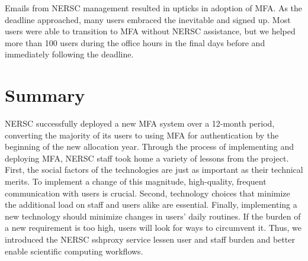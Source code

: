 \documentclass[sigconf,review]{acmart}
\begin{document}
Emails from NERSC management resulted in upticks in adoption of MFA. As the
deadline approached, many users embraced the inevitable and signed up. Most
users were able to transition to MFA without NERSC assistance, but we helped
more than 100 users during the office hours in the final days before and
immediately following the deadline.

\section{Summary}
\label{summary}

NERSC successfully deployed a new MFA system over a 12-month period, converting
the majority of its users to using MFA for authentication by the beginning of
the new allocation year. Through the process of implementing and deploying MFA,
NERSC staff took home a variety of lessons from the project. First, the social
factors of the technologies are just as important as their technical merits. To
implement a change of this magnitude, high-quality, frequent communication with
users is crucial. Second, technology choices that minimize the additional load
on staff and users alike are essential. Finally, implementing a new technology
should minimize changes in users' daily routines. If the burden of a new
requirement is too high, users will look for ways to circumvent it. Thus, we
introduced the NERSC sshproxy service lessen user and staff burden and better
enable scientific computing workflows.




\end{document}
